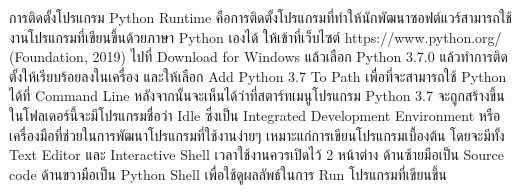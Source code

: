 การติดตั้งโปรแกรม Python Runtime คือการติดตั้งโปรแกรมที่ทำให้นักพัฒนาซอฟต์แวร์สามารถใช้งานโปรแกรมที่เขียนขึ้นด้วยภาษา Python เองได้ ให้เข้าที่เว็บไซต์ https://www.python.org/ (Foundation, 2019) ไปที่ Download for Windows แล้วเลือก Python 3.7.0 แล้วทำการติดตั้งให้เรียบร้อยลงในเครื่อง และให้เลือก Add Python 3.7 To Path เพื่อที่จะสามารถใช้ Python ได้ที่ Command Line หลังจากนั้นจะเห็นได้ว่าที่สตาร์ทเมนูโปรแกรม Python 3.7 จะถูกสร้างขึ้น ในโฟลเดอร์นี้จะมีโปรแกรมชื่อว่า Idle ซึ่งเป็น Integrated Development Environment หรือ เครื่องมือที่ช่วยในการพัฒนาโปรแกรมที่ใช้งานง่ายๆ เหมาะแก่การเขียนโปรแกรมเบื้องต้น โดยจะมีทั้ง Text Editor และ Interactive Shell เวลาใช้งานควรเปิดไว้ 2 หน้าต่าง ด้านซ้ายมือเป็น Source code ด้านขวามือเป็น Python Shell เพื่อใช้ดูผลลัพธ์ในการ Run โปรแกรมที่เขียนขึ้น








